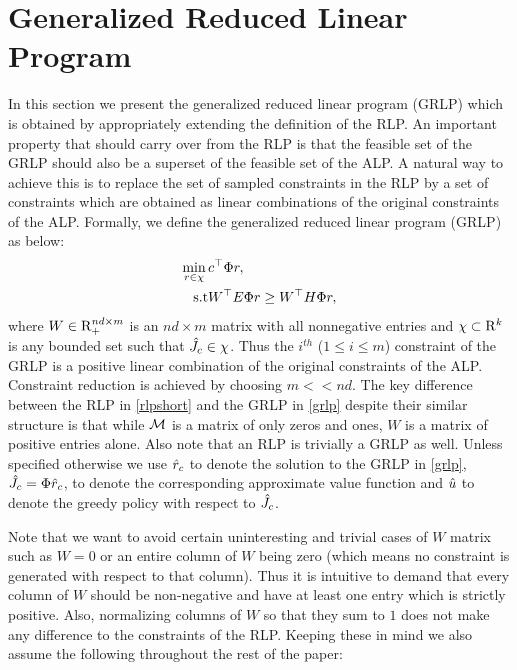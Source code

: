 \section{Generalized Reduced Linear Program}
In this section we present the generalized reduced linear program (GRLP) which is obtained by appropriately extending the definition of the RLP. An important property that should carry over from the RLP is that the feasible set of the GRLP should also be a superset of the feasible set of the ALP. A natural way to achieve this is to replace the set of sampled constraints in the RLP by a set of constraints which are obtained as linear combinations of the original constraints of the ALP. Formally, we define the generalized reduced linear program (GRLP) as below:
\begin{align}\label{grlp}
\begin{split}
\min_{r\in \chi}\, &c^\top \Phi r,\\
\text{s.t}\mb & W^\top E\Phi r\geq W^\top H \Phi r, 
\end{split}
\end{align}
where $W \in \mathrm{R}_+^{nd\times m}$ is an $nd\times m$ matrix with all nonnegative entries and $\chi \subset \mathrm{R}^k$ is any bounded set such that $\hat{J}_c \in \chi$. 
Thus the $i^{th}$ ($1\leq i\leq m$) constraint of the GRLP is a positive linear combination of the original constraints of the ALP. Constraint reduction is achieved by choosing $m<<nd$. The key difference between the RLP in \eqref{rlpshort} and the GRLP in \eqref{grlp} despite their similar structure is that while $\mathcal{M}$ is a matrix of only zeros and ones, $W$ is a matrix of positive entries alone. Also note that an RLP is trivially a GRLP as well. Unless specified otherwise we use $\hat{r}_c$ to denote the solution to the GRLP in \eqref{grlp}, $\hat{J}_c=\Phi \hat{r}_c$, to denote the corresponding approximate value function and $\hat{u}$ to denote the greedy policy with respect to $\hat{J}_c$.\par
Note that we want to avoid certain uninteresting and trivial cases of $W$ matrix such as $W=0$ or an entire column of $W$ being zero (which means no constraint is generated with respect to that column). Thus it is intuitive to demand that every column of $W$ should be non-negative and have at least one entry which is strictly positive. Also, normalizing columns of $W$ so that they sum to $1$ does not make any difference to the constraints of the RLP. Keeping these in mind we also assume the following throughout the rest of the paper:
